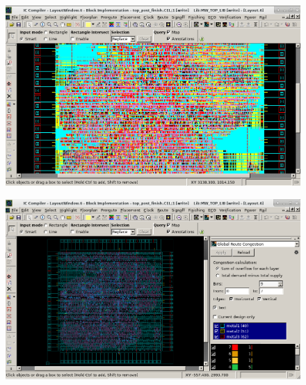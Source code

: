 \documentclass[a4paper]{article}
\begin{document}
\begin{figure}[!htb]
\centering
\includegraphics[scale=0.4]{./img/screenshot2}
\end{figure}

\begin{figure}[!htb]
\centering
\includegraphics[scale=0.4]{./img/congestions}
\end{figure}
\end{document}
